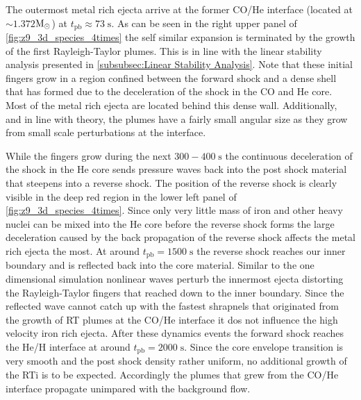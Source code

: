\documentclass[fleqn,usenatbib]{mnras}
\newcommand{\solm}{\xspace\ensuremath{\rm{M_{\odot}}}}
\begin{document}
The outermost metal rich ejecta arrive at the former CO/He interface (located at $\sim1.372$\solm) at $t_{\mathrm{pb}}\approx 73\;\mathrm{s}$.  As can be seen in the right upper panel of \autoref{fig:z9_3d_species_4times} the self similar expansion is terminated by the growth of the first Rayleigh-Taylor plumes. This is in line with the linear stability analysis presented in \autoref{subsubsec:Linear Stability Analysis}. Note that these initial fingers grow in a region confined between the forward shock and a dense shell that has formed due to the deceleration of the shock in the CO and He core. Most of the metal rich ejecta are located behind this dense wall. Additionally, and in line with theory, the plumes have a fairly small angular size as they grow from small scale perturbations at the interface. 

While the fingers grow during the next $300-400\;\mathrm{s}$ the continuous deceleration of the shock in the He core sends pressure waves back into the post shock material that steepens into a reverse shock. The position of the reverse shock is clearly visible in the deep red region in the lower left panel of \autoref{fig:z9_3d_species_4times}. Since only very little mass of iron and other heavy nuclei can be mixed into the He core before the reverse shock forms the large deceleration caused by the back propagation of the reverse shock affects the metal rich ejecta the most.
At around $t_{\mathrm{pb}}=1500\;\mathrm{s}$ the reverse shock reaches our inner boundary and is reflected back into the core material.
Similar to the one dimensional simulation nonlinear waves perturb the innermost ejecta distorting the Rayleigh-Taylor fingers that reached down to the inner boundary. Since the reflected wave cannot catch up with the fastest shrapnels that originated from the growth of RT plumes at the CO/He interface it dos not influence the high velocity iron rich ejecta.
After these dynamics events the forward shock reaches the He/H interface at around $t_{\mathrm{pb}}=2000\;\mathrm{s}$. Since the core envelope transition is very smooth and the post shock density rather uniform, no additional growth of the RTi is to be expected. Accordingly the plumes that grew from the CO/He interface propagate unimpared with the background flow. 
\end{document}
